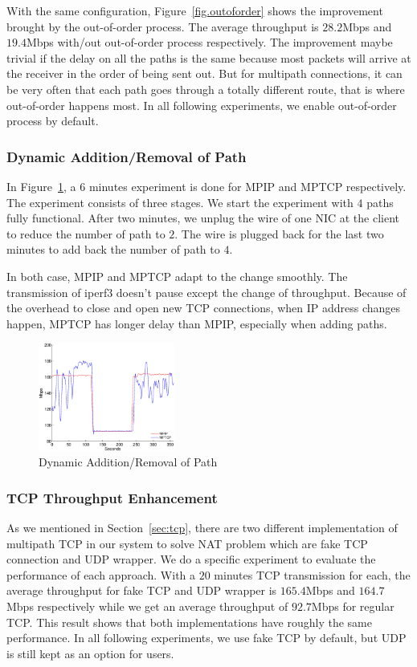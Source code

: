 With the same configuration, Figure~\ref{fig.outoforder} shows the improvement brought by the out-of-order process. The average throughput is $28.2$Mbps and $19.4$Mbps with/out out-of-order process respectively. The improvement maybe trivial if the delay on all the paths is the same because most packets will arrive at the receiver in the order of being sent out. But for multipath connections, it can be very often that each path goes through a totally different route, that is where out-of-order happens most. In all following experiments, we enable out-of-order process by default.

\subsubsection{Dynamic Addition/Removal of Path}
\label{sec:switch}

In Figure~\ref{fig.switch}, a $6$ minutes experiment is done for MPIP and MPTCP respectively. The experiment consists of three stages. We start the experiment with $4$ paths fully functional. After two minutes, we unplug the wire of one NIC at the client to reduce the number of path to $2$. The wire is plugged back for the last two minutes to add back the number of path to $4$.

In both case, MPIP and MPTCP adapt to the change smoothly. The transmission of iperf3 doesn't pause except the change of throughput. Because of the overhead to close and open new TCP connections, when IP address changes happen, MPTCP has longer delay than MPIP, especially when adding paths.

\begin{figure}
\centering
\includegraphics[width=0.8\linewidth,height=1.4in]{fig/switch.eps}
\caption{Dynamic Addition/Removal of Path}
\label{fig.switch}
\end{figure}


\subsubsection{TCP Throughput Enhancement}
\label{sec:tcptp}

As we mentioned in Section~\ref{sec:tcp}, there are two different implementation of multipath TCP in our system to solve NAT problem which are fake TCP connection and UDP wrapper. We do a specific experiment to evaluate the performance of each approach. With a $20$ minutes TCP transmission for each, the average throughput for fake TCP and UDP wrapper is $165.4$Mbps and $164.7$Mbps respectively while we get an average throughput of $92.7$Mbps for regular TCP. This result shows that both implementations have roughly the same performance. In all following experiments, we use fake TCP by default, but UDP is still kept as an option for users.


